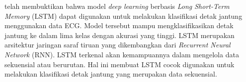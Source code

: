 
\textcite{shchetininArrhythmiaDetectionUsing2022} telah membuktikan bahwa model \textit{deep learning} berbasis \emph{Long Short-Term Memory} (LSTM) dapat digunakan untuk melakukan klasifikasi detak jantung menggunakan data ECG.
Model tersebut mampu mengklasifikasikan detak jantung ke dalam lima kelas dengan akurasi yang tinggi.
LSTM merupakan arsitektur jaringan saraf tiruan yang dikembangkan dari \emph{Recurrent Neural Network} (RNN).
LSTM terkenal akan kemampuannya dalam mengelola data sekuensial atau berurutan.
Hal ini membuat LSTM cocok digunakan untuk melakukan klasifikasi detak jantung yang merupakan data sekuensial.


